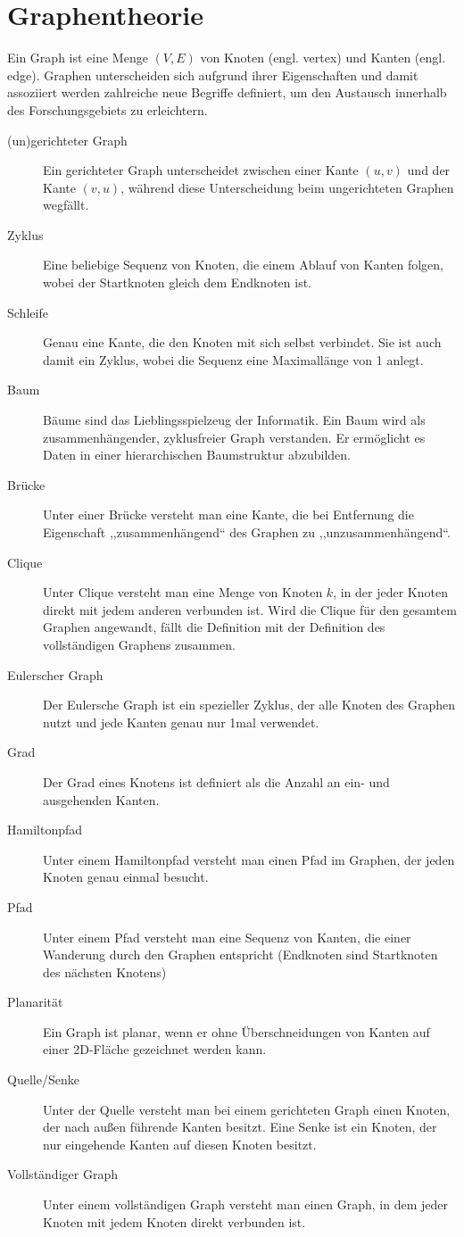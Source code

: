 \chapter{Graphentheorie}
%
Ein Graph ist eine Menge $(V, E)$ von Knoten (engl. vertex) und Kanten (engl. edge). Graphen unterscheiden sich aufgrund ihrer Eigenschaften und damit assoziiert werden zahlreiche neue Begriffe definiert, um den Austausch innerhalb des Forschungsgebiets zu erleichtern.
%
\begin{description}
  \item[(un)gerichteter Graph]
    Ein gerichteter Graph unterscheidet zwischen einer Kante $(u, v)$ und der Kante $(v, u)$, während diese Unterscheidung beim ungerichteten Graphen wegfällt.
  \item[Zyklus]
   Eine beliebige Sequenz von Knoten, die einem Ablauf von Kanten folgen, wobei der Startknoten gleich dem Endknoten ist.
  \item[Schleife]
   Genau eine Kante, die den Knoten mit sich selbst verbindet. Sie ist auch damit ein Zyklus, wobei die Sequenz eine Maximallänge von 1 anlegt.
  \item[Baum]
   Bäume sind das Lieblingsspielzeug der Informatik. Ein Baum wird als zusammenhängender, zyklusfreier Graph verstanden. Er ermöglicht es Daten in einer hierarchischen Baumstruktur abzubilden.
  \item[Brücke]
   Unter einer Brücke versteht man eine Kante, die bei Entfernung die Eigenschaft ,,zusammenhängend`` des Graphen zu ,,unzusammenhängend``.
  \item[Clique]
   Unter Clique versteht man eine Menge von Knoten $k$, in der jeder Knoten direkt mit jedem anderen verbunden ist. Wird die Clique für den gesamtem Graphen angewandt, fällt die Definition mit der Definition des vollständigen Graphens zusammen.
  \item[Eulerscher Graph]
   Der Eulersche Graph ist ein spezieller Zyklus, der alle Knoten des Graphen nutzt und jede Kanten genau nur 1mal verwendet.
  \item[Grad]
   Der Grad eines Knotens ist definiert als die Anzahl an ein- und ausgehenden Kanten.
  \item[Hamiltonpfad]
   Unter einem Hamiltonpfad versteht man einen Pfad im Graphen, der jeden Knoten genau einmal besucht.
  \item[Pfad]
   Unter einem Pfad versteht man eine Sequenz von Kanten, die einer Wanderung durch den Graphen entspricht (Endknoten sind Startknoten des nächsten Knotens)
  \item[Planarität]
   Ein Graph ist planar, wenn er ohne Überschneidungen von Kanten auf einer 2D-Fläche gezeichnet werden kann.
  \item[Quelle/Senke]
   Unter der Quelle versteht man bei einem gerichteten Graph einen Knoten, der nach außen führende Kanten besitzt. Eine Senke ist ein Knoten, der nur eingehende Kanten auf diesen Knoten besitzt.
  \item[Vollständiger Graph]
   Unter einem vollständigen Graph versteht man einen Graph, in dem jeder Knoten mit jedem Knoten direkt verbunden ist.
\end{description}


